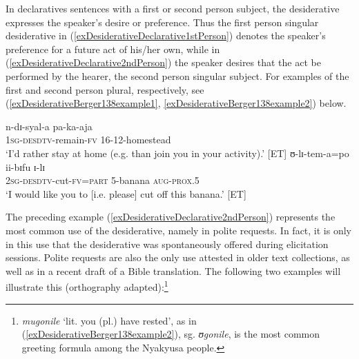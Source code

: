 In declaratives sentences with a first or second person subject, the desiderative expresses the speaker's desire or preference. Thus the first person singular desiderative in (\ref{exDesiderativeDeclarative1stPerson}) denotes the speaker's preference for a future act of his/her own, while in (\ref{exDesiderativeDeclarative2ndPerson}) the speaker desires that the act be performed by the hearer, the second person singular subject. For examples of the first and second person plural, respectively, see
(\ref{exDesiderativeBerger138example1}, \ref{exDesiderativeBerger138example2}) below.
\begin{exe}
\ex\label{exDesiderativeDeclarative1stPerson} \gll n-dɪ-syal-a pa-ka-aja\\
\textsc{1sg}-\textsc{desdtv}-remain-\textsc{fv} 16-12-homestead\\
\glt `I'd rather stay at home (e.g. than join you in your activity).' [ET]
\ex\label{exDesiderativeDeclarative2ndPerson} \gll ʊ-lɪ-tem-a=po ii-bɪfu ɪ-lɪ\\
\textsc{2sg}-\textsc{desdtv}-cut-\textsc{fv}=\textsc{part} 5-banana \textsc{aug}-\textsc{prox.5}\\
\glt \lq I would like you to [i.e. please] cut off this banana.' [ET]
\end{exe}

The preceding example (\ref{exDesiderativeDeclarative2ndPerson}) represents the most common use of the desiderative, namely in polite requests. In fact, it is only in this use that the desiderative was spontaneously offered during elicitation sessions. Polite requests are also the only use attested in older text collections, as well as in a recent draft of a Bible translation. The following two examples will illustrate this (orthography adapted):\footnote{\textit{mugonile} \lq lit. you (pl.) have rested', as in (\ref{exDesiderativeBerger138example2}), sg. \textit{ʊgonile}, is the most common greeting formula among the Nyakyusa people.}

